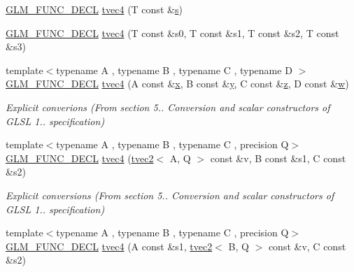 \begin{DoxyCompactItemize}
\item 
\hyperlink{setup_8hpp_ab2d052de21a70539923e9bcbf6e83a51}{G\+L\+M\+\_\+\+F\+U\+N\+C\+\_\+\+D\+E\+CL} \hyperlink{structglm_1_1detail_1_1tvec4_af4c65b47ca8e04cb84fc7daf5f30d7ad}{tvec4} (T const \&\hyperlink{structglm_1_1detail_1_1tvec4_a82cbced4cbd070056c5acbc1d4d4906f}{s})
\item 
\hyperlink{setup_8hpp_ab2d052de21a70539923e9bcbf6e83a51}{G\+L\+M\+\_\+\+F\+U\+N\+C\+\_\+\+D\+E\+CL} \hyperlink{structglm_1_1detail_1_1tvec4_a7b81815685a8d9e0fbdd9b660750ef26}{tvec4} (T const \&s0, T const \&s1, T const \&s2, T const \&s3)
\item 
{\footnotesize template$<$typename A , typename B , typename C , typename D $>$ }\\\hyperlink{setup_8hpp_ab2d052de21a70539923e9bcbf6e83a51}{G\+L\+M\+\_\+\+F\+U\+N\+C\+\_\+\+D\+E\+CL} \hyperlink{structglm_1_1detail_1_1tvec4_aa19075717a5439da09d279cc4b2b9a73}{tvec4} (A const \&\hyperlink{structglm_1_1detail_1_1tvec4_a432497fdfcbcf5ccd75b822cdebafe6b}{x}, B const \&\hyperlink{structglm_1_1detail_1_1tvec4_a693e41210b49a742eb6c1fd0eb8acb3a}{y}, C const \&\hyperlink{structglm_1_1detail_1_1tvec4_a382ff89e1d0594bd8366d532b4e3c28a}{z}, D const \&\hyperlink{structglm_1_1detail_1_1tvec4_a6b1f294d076a4a08420e7d8131a2f0ea}{w})
\begin{DoxyCompactList}\small\item\em Explicit converions (From section 5.. Conversion and scalar constructors of G\+L\+SL 1.. specification) \end{DoxyCompactList}\item 
{\footnotesize template$<$typename A , typename B , typename C , precision Q$>$ }\\\hyperlink{setup_8hpp_ab2d052de21a70539923e9bcbf6e83a51}{G\+L\+M\+\_\+\+F\+U\+N\+C\+\_\+\+D\+E\+CL} \hyperlink{structglm_1_1detail_1_1tvec4_a5fa780e942ec21ec77ec2fe9d8f57cf3}{tvec4} (\hyperlink{structglm_1_1detail_1_1tvec2}{tvec2}$<$ A, Q $>$ const \&v, B const \&s1, C const \&s2)
\begin{DoxyCompactList}\small\item\em Explicit conversions (From section 5.. Conversion and scalar constructors of G\+L\+SL 1.. specification) \end{DoxyCompactList}\item 
{\footnotesize template$<$typename A , typename B , typename C , precision Q$>$ }\\\hyperlink{setup_8hpp_ab2d052de21a70539923e9bcbf6e83a51}{G\+L\+M\+\_\+\+F\+U\+N\+C\+\_\+\+D\+E\+CL} \hyperlink{structglm_1_1detail_1_1tvec4_ad3de2f66c42e8d6c46d9f85abef13ea2}{tvec4} (A const \&s1, \hyperlink{structglm_1_1detail_1_1tvec2}{tvec2}$<$ B, Q $>$ const \&v, C const \&s2)

\end{DoxyCompactItemize}
